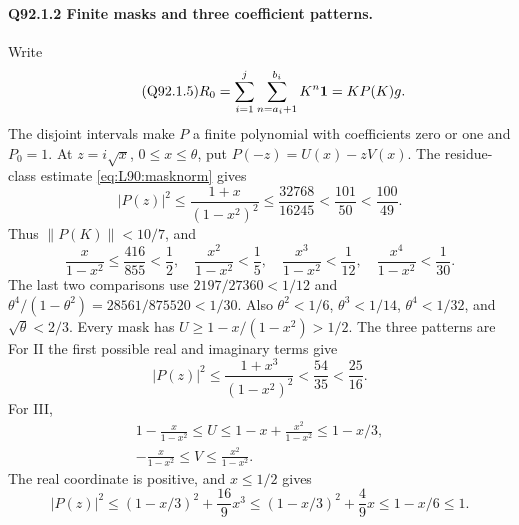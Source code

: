\paragraph{Q92.1.2 Finite masks and three coefficient patterns.}
Write
\begin{equation}\tag{Q92.1.5}\label{eq:Q92:1.5}
R_0=\sum_{i=1}^j\sum_{n=a_i+1}^{b_i}K^n\mathbf1=KP(K)g.
\end{equation}
The disjoint intervals make \(P\) a finite polynomial with coefficients
zero or one and \(P_0=\allowbreak 1\). At \(z=\allowbreak i\sqrt x\), \(0\le\allowbreak  x\le\allowbreak \theta\),
put \(P(-z)=\allowbreak U(x)-zV(x)\). The residue-class estimate
\eqref{eq:L90:masknorm} gives
\begin{equation}\tag{Q92.1.6}\label{eq:Q92:1.6}
|P(z)|^2\le\frac{1+x}{(1-x^2)^2}
\le\frac{32768}{16245}<\frac{101}{50}<\frac{100}{49}.
\end{equation}
Thus \(\|P(K)\|<\allowbreak 10/7\), and
\begin{equation}\tag{Q92.1.7}\label{eq:Q92:1.7}
\frac{x}{1-x^2}\le\frac{416}{855}<\frac12,\quad
\frac{x^2}{1-x^2}<\frac15,\quad
\frac{x^3}{1-x^2}<\frac1{12},\quad
\frac{x^4}{1-x^2}<\frac1{30}.
\end{equation}
The last two comparisons use \(2197/27360<\allowbreak 1/12\) and
\(\theta^4/(1-\theta^2)=\allowbreak 28561/875520<\allowbreak 1/30\).
Also \(\theta^2<\allowbreak 1/6\), \(\theta^3<\allowbreak 1/14\), \(\theta^4<\allowbreak 1/32\),
and \(\sqrt\theta<\allowbreak 2/3\). Every mask has
\(U\ge\allowbreak 1-x/(1-x^2)>\allowbreak 1/2\). The three patterns are
For II the first possible real and imaginary terms give
\begin{equation}\tag{Q92.1.8}\label{eq:Q92:1.8}
|P(z)|^2\le\frac{1+x^3}{(1-x^2)^2}<\frac{54}{35}<\frac{25}{16}.
\end{equation}
For III,
\begin{equation}\tag{Q92.1.9}\label{eq:Q92:1.9}
\begin{gathered}
1-\frac{x}{1-x^2}\le U\le1-x+\frac{x^2}{1-x^2}\le1-x/3,\\
-\frac{x}{1-x^2}\le V\le\frac{x^2}{1-x^2}.
\end{gathered}
\end{equation}
The real coordinate is positive, and \(x\le\allowbreak 1/2\) gives
\begin{equation}\tag{Q92.1.10}\label{eq:Q92:1.10}
|P(z)|^2\le(1-x/3)^2+\frac{16}{9}x^3
\le(1-x/3)^2+\frac49x\le1-x/6\le1.
\end{equation}

